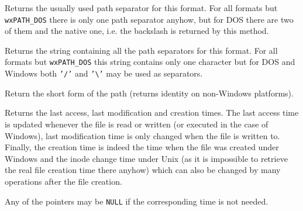 \label{wxfilenamegetpathseparator}


Returns the usually used path separator for this format. For all formats but 
{\tt wxPATH\_DOS} there is only one path separator anyhow, but for DOS there
are two of them and the native one, i.e. the backslash is returned by this
method.



\label{wxfilenamegetpathseparators}


Returns the string containing all the path separators for this format. For all
formats but {\tt wxPATH\_DOS} this string contains only one character but for
DOS and Windows both {\tt '/'} and {\tt '\textbackslash'} may be used as
separators.



\label{wxfilenamegetshortpath}


Return the short form of the path (returns identity on non-Windows platforms).

\label{wxfilenamegettimes}


Returns the last access, last modification and creation times. The last access
time is updated whenever the file is read or written (or executed in the case
of Windows), last modification time is only changed when the file is written
to. Finally, the creation time is indeed the time when the file was created
under Windows and the inode change time under Unix (as it is impossible to
retrieve the real file creation time there anyhow) which can also be changed
by many operations after the file creation.

Any of the pointers may be {\tt NULL} if the corresponding time is not
needed.

